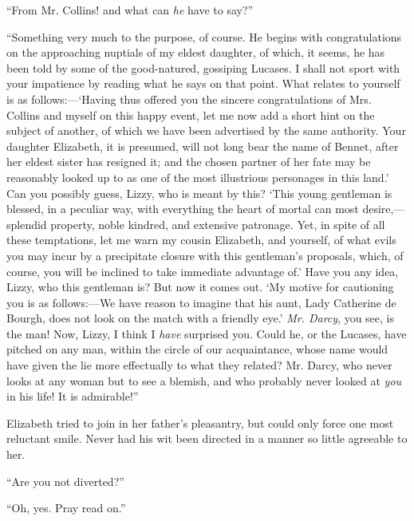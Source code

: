\documentclass[12pt]{book}
\begin{document}
``From Mr. Collins! and what can \textit{he} have to say?''

``Something very much to the purpose, of course. He begins with congratulations on the approaching nuptials of my eldest daughter, of which, it seems, he has been told by some of the good-natured, gossiping Lucases. I shall not sport with your impatience by reading what he says on that point. What relates to yourself is as follows:---`Having thus offered you the sincere congratulations of Mrs. Collins and myself on this happy event, let me now add a short hint on the subject of another, of which we have been advertised by the same authority. Your daughter Elizabeth, it is presumed, will not long bear the name of Bennet, after her eldest sister has resigned it; and the chosen partner of her fate may be reasonably looked up to as one of the most illustrious personages in this land.' Can you possibly guess, Lizzy, who is meant by this? `This young gentleman is blessed, in a peculiar way, with everything the heart of mortal can most desire,---splendid property, noble kindred, and extensive patronage. Yet, in spite of all these temptations, let me warn my cousin Elizabeth, and yourself, of what evils you may incur by a precipitate closure with this gentleman's proposals, which, of course, you will be inclined to take immediate advantage of.' Have you any idea, Lizzy, who this gentleman is? But now it comes out. `My motive for cautioning you is as follows:---We have reason to imagine that his aunt, Lady Catherine de Bourgh, does not look on the match with a friendly eye.' \textit{Mr. Darcy}, you see, is the man! Now, Lizzy, I think I \textit{have} surprised you. Could he, or the Lucases, have pitched on any man, within the circle of our acquaintance, whose name would have given the lie more effectually to what they related? Mr. Darcy, who never looks at any woman but to see a blemish, and who probably never looked at \textit{you} in his life! It is admirable!''

Elizabeth tried to join in her father's pleasantry, but could only force one most reluctant smile. Never had his wit been directed in a manner so little agreeable to her.

``Are you not diverted?''

``Oh, yes. Pray read on.''
\end{document}
